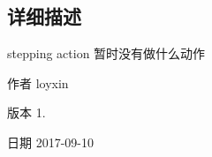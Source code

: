 \subsection{详细描述}
stepping action 暂时没有做什么动作 

\begin{DoxyAuthor}{作者}
loyxin 
\end{DoxyAuthor}
\begin{DoxyVersion}{版本}
1. 
\end{DoxyVersion}
\begin{DoxyDate}{日期}
2017-\/09-\/10 
\end{DoxyDate}
